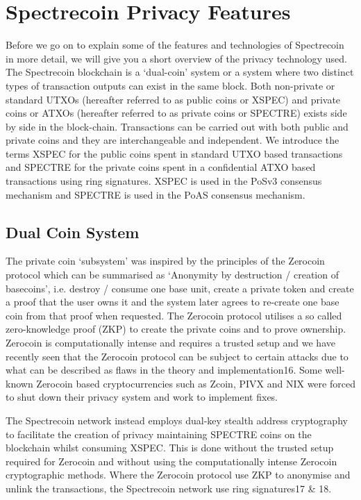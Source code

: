 \chapter{Spectrecoin Privacy Features}
Before we go on to explain some of the features and technologies of
Spectrecoin in more detail, we will give you a short overview of the
privacy technology used. The Spectrecoin blockchain is a ‘dual-coin’
system or a system where two distinct types of transaction outputs can
exist in the same block. Both non-private or standard UTXOs (hereafter
referred to as public coins or XSPEC) and private coins or ATXOs (hereafter
referred to as private coins or SPECTRE) exists side by side in the
block-chain. Transactions can be carried out with both public and private
coins and they are interchangeable and independent. We introduce the terms
XSPEC for the public coins spent in standard UTXO based transactions and
SPECTRE for the private coins spent in a confidential ATXO based
transactions using ring signatures. XSPEC is used in the PoSv3 consensus
mechanism and SPECTRE is used in the PoAS consensus mechanism.



\section{Dual Coin System}
The private coin ‘subsystem’ was inspired by the principles of the Zerocoin
protocol which can be summarised as ‘Anonymity by destruction / creation of
basecoins’, i.e. destroy / consume one base unit, create a private token
and create a proof that the user owns it and the system later agrees to
re-create one base coin from that proof when requested. The Zerocoin protocol
utilises a so called zero-knowledge proof (ZKP) to create the private coins
and to prove ownership. Zerocoin is computationally intense and requires a
trusted setup and we have recently seen that the Zerocoin protocol can be
subject to certain attacks due to what can be described as flaws in the
theory and implementation16. Some well-known Zerocoin based cryptocurrencies
such as Zcoin, PIVX and NIX were forced to shut down their privacy system and
work to implement fixes.



The Spectrecoin network instead employs dual-key stealth address cryptography
to facilitate the creation of privacy maintaining SPECTRE coins on the
blockchain whilst consuming XSPEC. This is done without the trusted setup
required for Zerocoin and without using the computationally intense Zerocoin
cryptographic methods. Where the Zerocoin protocol use ZKP to anonymise and
unlink the transactions, the Spectrecoin network use ring signatures17 \& 18.



